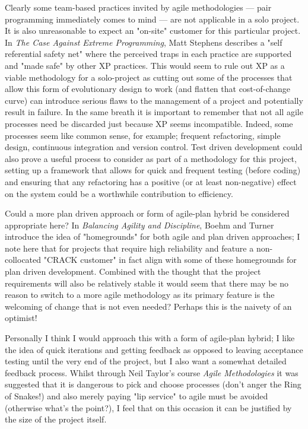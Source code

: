 Clearly some team-based practices invited by agile methodologies ---
pair programming immediately comes to mind --- are not applicable in a solo
project. It is also unreasonable to expect an "on-site" customer for this
particular project. In \textit{The Case Against Extreme Programming}, Matt Stephens
describes a "self referential safety net" where the perceived traps in each
practice are supported and "made safe" by other XP practices.  This would seem
to rule out XP as a viable methodology for a solo-project as cutting out some
of the processes that allow this form of evolutionary design to work (and
flatten that cost-of-change curve) can introduce serious flaws to the
management of a project and potentially result in failure. In the same breath
it is important to remember that not all agile processes need be discarded just
because XP seems incompatible. Indeed, some processes seem like common sense,
for example; frequent refactoring, simple design, continuous integration and
version control. Test driven development could also prove a useful process to
consider as part of a methodology for this project, setting up a framework that
allows for quick and frequent testing (before coding) and ensuring that any
refactoring has a positive (or at least non-negative) effect on the system
could be a worthwhile contribution to efficiency.

Could a more plan driven approach or form of agile-plan hybrid be considered
appropriate here? In \textit{Balancing Agility and Discipline}, Boehm
and Turner introduce the idea of "homegrounds" for both agile and plan driven
approaches; I note here that for projects that require high reliability and
feature a non-collocated "CRACK customer" in fact align with some of these
homegrounds for plan driven development. Combined with the thought that the
project requirements will also be relatively stable it would seem that there
may be no reason to switch to a more agile methodology as its primary feature
is the welcoming of change that is not even needed? Perhaps this is the naivety
of an optimist!

Personally I think I would approach this with a form of agile-plan hybrid; I
like the idea of quick iterations and getting feedback as opposed to leaving
acceptance testing until the very end of the project, but I also want a somewhat
detailed feedback process. Whilst through Neil Taylor's course \textit{Agile
Methodologies} it was suggested that it is dangerous to pick and choose
processes (don’t anger the Ring of Snakes!) and also merely paying "lip service"
to agile must be avoided (otherwise what's the point?), I feel that on this
occasion it can be justified by the size of the project itself.

